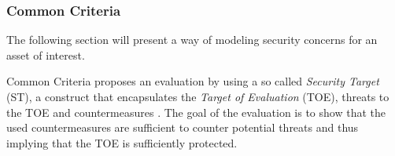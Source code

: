 %
%
%
%
%

\subsubsection{Common Criteria}
The following section will present a way of modeling security concerns for an asset of interest.

Common Criteria proposes an evaluation by using a so called \textit{Security Target} (ST), a construct that encapsulates the \textit{Target of Evaluation} (TOE), threats to the TOE and countermeasures \cite{commoncriteria}. The goal of the evaluation is to show that the used countermeasures are sufficient to counter potential threats and thus implying that the TOE is sufficiently protected.

